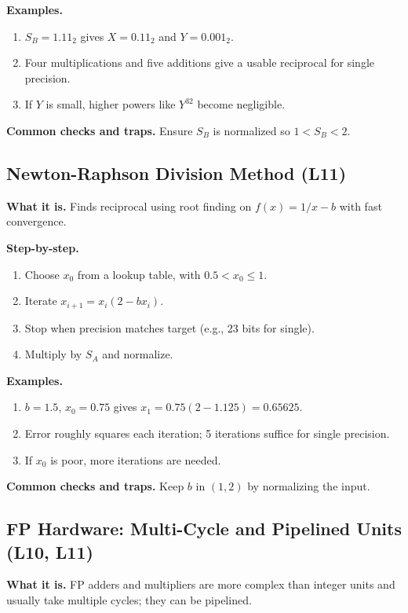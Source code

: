 \documentclass[11pt]{article}
\begin{document}
\textbf{Examples.}
\begin{enumerate}[leftmargin=*]
  \item $S_B=1.11_2$ gives $X=0.11_2$ and $Y=0.001_2$.
  \item Four multiplications and five additions give a usable reciprocal for single precision.
  \item If $Y$ is small, higher powers like $Y^{32}$ become negligible.
\end{enumerate}

\textbf{Common checks and traps.} Ensure $S_B$ is normalized so $1 < S_B < 2$.

\subsection{Newton-Raphson Division Method (L11)}
\textbf{What it is.} Finds reciprocal using root finding on $f(x)=1/x-b$ with fast convergence.

\textbf{Step-by-step.}
\begin{enumerate}[leftmargin=*]
  \item Choose $x_0$ from a lookup table, with $0.5 < x_0 \le 1$.
  \item Iterate $x_{i+1} = x_i(2 - b x_i)$.
  \item Stop when precision matches target (e.g., 23 bits for single).
  \item Multiply by $S_A$ and normalize.
\end{enumerate}

\textbf{Examples.}
\begin{enumerate}[leftmargin=*]
  \item $b=1.5$, $x_0=0.75$ gives $x_1=0.75(2-1.125)=0.65625$.
  \item Error roughly squares each iteration; 5 iterations suffice for single precision.
  \item If $x_0$ is poor, more iterations are needed.
\end{enumerate}

\textbf{Common checks and traps.} Keep $b$ in $(1,2)$ by normalizing the input.

\subsection{FP Hardware: Multi-Cycle and Pipelined Units (L10, L11)}
\textbf{What it is.} FP adders and multipliers are more complex than integer units and usually take multiple cycles; they can be pipelined.
\end{document}
